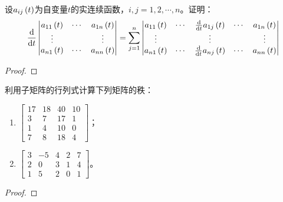 \begin{problem}
设\(a_{ij}\left( t \right)\)为自变量\(t\)的实连续函数，\(i,j=1,2,\cdots,n\)。证明：
\begin{equation*}
    \frac{\mathrm{d}}{\mathrm{d} t}
    \begin{vmatrix}
        a_{11}\left( t \right) & \cdots & a_{1n}\left( t \right) \\
        \vdots          &        & \vdots          \\
        a_{n1}\left( t \right) & \cdots & a_{nn}\left( t \right)
    \end{vmatrix}=\sum_{j=1}^n
    \begin{vmatrix}
        a_{11}\left( t \right) & \cdots & \frac{\mathrm{d}}{\mathrm{d} t}a_{1j}\left( t \right) & \cdots & a_{1n}\left( t \right) \\
        \vdots          &        & \vdots                     &        & \vdots          \\
        a_{n1}\left( t \right) & \cdots & \frac{\mathrm{d}}{\mathrm{d} t}a_{nj}\left( t \right) & \cdots & a_{nn}\left( t \right)
    \end{vmatrix}
\end{equation*}
\end{problem}
\begin{proof}
\end{proof}

\begin{problem}
利用子矩阵的行列式计算下列矩阵的秩：
\begin{enumerate}
    \item \(\begin{bmatrix}
              17 & 18 & 40 & 10 \\
              3  & 7  & 17 & 1  \\
              1  & 4  & 10 & 0  \\
              7  & 8  & 18 & 4
          \end{bmatrix}\)；
    \item \(\begin{bmatrix}
              3 & -5 & 4 & 2 & 7 \\
              2 & 0  & 3 & 1 & 4 \\
              1 & 5  & 2 & 0 & 1
          \end{bmatrix}\)。
\end{enumerate}
\end{problem}
\begin{proof}
\end{proof}